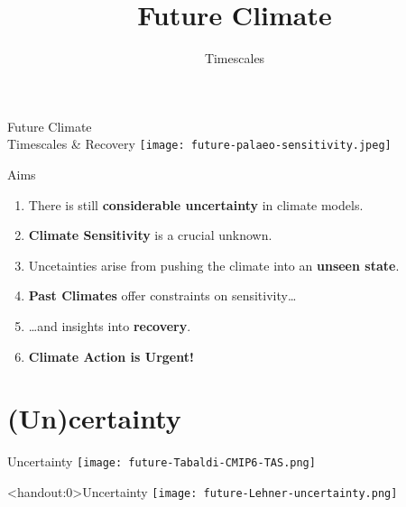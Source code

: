 

\title{Future Climate}
\author{Timescales}




\begin{frame}{Future Climate\\Timescales \& Recovery}
    \texttt{[image: future-palaeo-sensitivity.jpeg]}
\end{frame}

\begin{frame}{Aims}

    \begin{enumerate}
        \item There is still \textbf{considerable uncertainty} in climate models.
        \item \textbf{Climate Sensitivity} is a crucial unknown.
        \item Uncetainties arise from pushing the climate into an \textbf{unseen state}.
        \item \textbf{Past Climates} offer constraints on sensitivity\dots
        \item \dots and insights into \textbf{recovery}.
        \item \textbf{Climate Action is Urgent!}
    \end{enumerate}

\end{frame}

\section{(Un)certainty}

\begin{frame}{Uncertainty}
    \centering
    \texttt{[image: future-Tabaldi-CMIP6-TAS.png]}
\end{frame}

\begin{frame}<handout:0>{Uncertainty}
    \centering
    \texttt{[image: future-Lehner-uncertainty.png]}
\end{frame}

